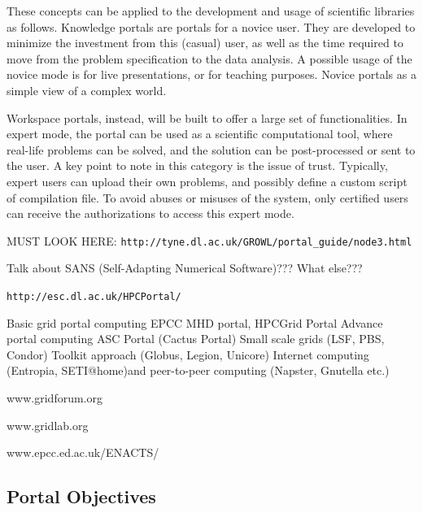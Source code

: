 \documentclass[11pt,relax]{SANDreport}
\begin{document}
These concepts can be applied to the development and usage of scientific
libraries as follows. Knowledge portals are portals for a novice user. They
are developed to minimize the investment
from this (casual) user, as well as the time required to move from the problem
specification to the data analysis. A possible usage of the novice mode is for
live presentations, or for teaching purposes. Novice portals as a simple view
of a complex world.

Workspace portals, instead, will be built to offer a large set of
functionalities. In expert mode, the portal can be used as a scientific
computational tool, where real-life problems can be solved, and the solution
can be post-processed or sent to the user.  A key point to note in this
category is the issue of trust. Typically, expert users can upload their own
problems, and possibly define a custom script of compilation file. To avoid
abuses or misuses of the system, only certified users can receive the
authorizations to access this expert mode.

\bigskip

MUST LOOK HERE: \verb!http://tyne.dl.ac.uk/GROWL/portal_guide/node3.html!

Talk about SANS (Self-Adapting Numerical Software)??? What else???

\verb!http://esc.dl.ac.uk/HPCPortal/!

Basic grid portal computing 
EPCC MHD portal, HPCGrid Portal 
Advance portal computing 
ASC Portal (Cactus Portal) 
Small scale grids (LSF, PBS, Condor) 
Toolkit approach (Globus, Legion, Unicore) 
Internet computing (Entropia, SETI@home)and peer-to-peer computing (Napster, Gnutella etc.)


www.gridforum.org

www.gridlab.org 

www.epcc.ed.ac.uk/ENACTS/

\subsection{Portal Objectives}
\end{document}
